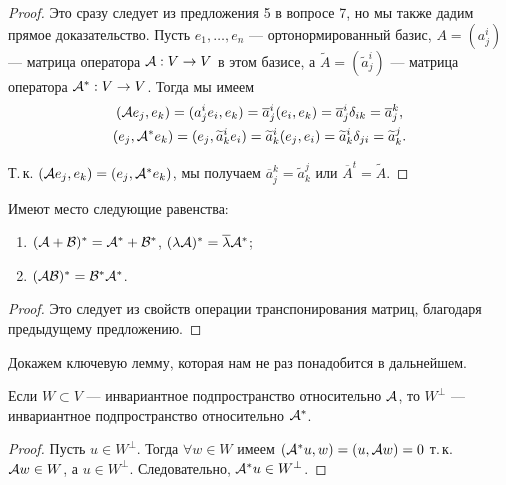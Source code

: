 \begin{proof}
    Это сразу следует из предложения 5 в вопросе 7, но мы также дадим прямое доказательство. Пусть $e_1, \ldots, e_n$ --- ортонормированный базис, $A = (a^i_j)$ --- матрица оператора $\mathcal{A}: V \to V$ в этом базисе, а $\widetilde{A} = (\widetilde{a}^i_j)$ --- матрица оператора $\mathcal{A}^\ast: V \to V$. Тогда мы имеем
    \begin{gather*}
        (\mathcal{A} e_j, e_k) = (a^i_je_i, e_k) = \overline{a}^i_j(e_i, e_k) = \overline{a}^i_j\delta_{ik} = \overline{a}^k_j,\\
        (e_j, \mathcal{A}^\ast e_k) = (e_j, \widetilde{a}^i_ke_i) = \widetilde{a}^i_k(e_j, e_i) = \widetilde{a}^i_k\delta_{ji} = \widetilde{a}^j_k.
    \end{gather*}

    Т.\,к. $(\mathcal{A} e_j, e_k) = (e_j, \mathcal{A}^\ast e_k)$, мы получаем $\overline{a}^k_j = \widetilde{a}^j_k$ или $\overline{A}^t = \widetilde{A}$.
\end{proof}

\begin{proposal}
    Имеют место следующие равенства:
    \begin{enumerate}[nolistsep]
        \item $(\mathcal{A} + \mathcal{B})^\ast = \mathcal{A}^\ast + \mathcal{B}^\ast$, $(\lambda\mathcal{A})^\ast = \overline{\lambda}\mathcal{A}^\ast$;
        \item $(\mathcal{A}\mathcal{B})^\ast = \mathcal{B}^\ast\mathcal{A}^\ast$.
    \end{enumerate}
\end{proposal}

\begin{proof}
    Это следует из свойств операции транспонирования матриц, благодаря предыдущему предложению.
\end{proof}

Докажем ключевую лемму, которая нам не раз понадобится в дальнейшем.

\begin{lemma}[Важная]
    Если $W \subset V$ --- инвариантное подпространство относительно $\mathcal{A}$, то $W^\perp$ --- инвариантное подпространство относительно $\mathcal{A}^\ast$.
\end{lemma}

\begin{proof}
    Пусть $u \in W^\perp$. Тогда $\forall w \in W$ имеем $(\mathcal{A}^\ast u, w) = (u, \mathcal{A} w) = 0$ т.\,к. $\mathcal{A} w \in W$, а $u \in W^\perp$. Следовательно, $\mathcal{A}^\ast u \in W^\perp$.
\end{proof}

